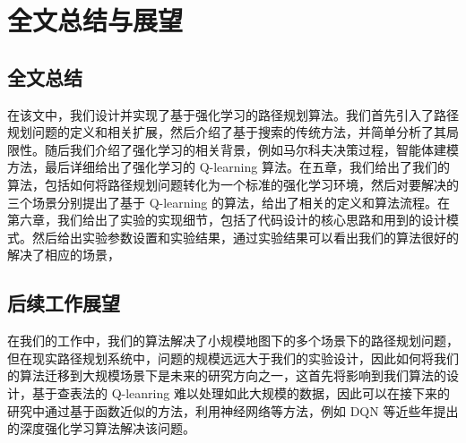\documentclass{standalone}
\begin{document}
\chapter{全文总结与展望}
\section{全文总结}
在该文中，我们设计并实现了基于强化学习的路径规划算法。我们首先引入了路径规划问题的定义和相关扩展，然后介绍了基于搜索的传统方法，并简单分析了其局限性。随后我们介绍了强化学习的相关背景，例如马尔科夫决策过程，智能体建模方法，最后详细给出了强化学习的 Q-learning 算法。在五章，我们给出了我们的算法，包括如何将路径规划问题转化为一个标准的强化学习环境，然后对要解决的三个场景分别提出了基于 Q-learning 的算法，给出了相关的定义和算法流程。在第六章，我们给出了实验的实现细节，包括了代码设计的核心思路和用到的设计模式。然后给出实验参数设置和实验结果，通过实验结果可以看出我们的算法很好的解决了相应的场景，
\section{后续工作展望}
在我们的工作中，我们的算法解决了小规模地图下的多个场景下的路径规划问题，但在现实路径规划系统中，问题的规模远远大于我们的实验设计，因此如何将我们的算法迁移到大规模场景下是未来的研究方向之一，这首先将影响到我们算法的设计，基于查表法的 Q-leanring 难以处理如此大规模的数据，因此可以在接下来的研究中通过基于函数近似的方法，利用神经网络等方法，例如 DQN 等近些年提出的深度强化学习算法解决该问题。\par
\end{document}
